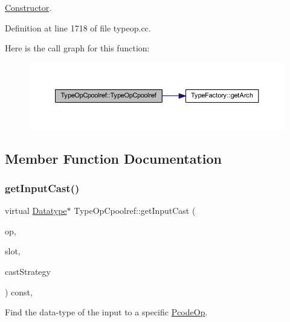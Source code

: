\mbox{\hyperlink{class_constructor}{Constructor}}. 



Definition at line 1718 of file typeop.\+cc.

Here is the call graph for this function\+:
\nopagebreak
\begin{figure}[H]
\begin{center}
\leavevmode
\includegraphics[width=350pt]{class_type_op_cpoolref_af24f28c844c4c945ef9a223b48d2e955_cgraph}
\end{center}
\end{figure}


\subsection{Member Function Documentation}
\mbox{\label{class_type_op_cpoolref_a5cc9b6921ce5b3672dc96af17134474f}} 
\subsubsection{\texorpdfstring{getInputCast()}{getInputCast()}}
{\footnotesize\ttfamily virtual \mbox{\hyperlink{class_datatype}{Datatype}}$\ast$ Type\+Op\+Cpoolref\+::get\+Input\+Cast (\begin{DoxyParamCaption}\item[{const \mbox{\hyperlink{class_pcode_op}{Pcode\+Op}} $\ast$}]{op,  }\item[{int4}]{slot,  }\item[{const \mbox{\hyperlink{class_cast_strategy}{Cast\+Strategy}} $\ast$}]{cast\+Strategy }\end{DoxyParamCaption}) const\hspace{0.3cm}{\ttfamily [inline]}, {\ttfamily [virtual]}}



Find the data-\/type of the input to a specific \mbox{\hyperlink{class_pcode_op}{Pcode\+Op}}. 


